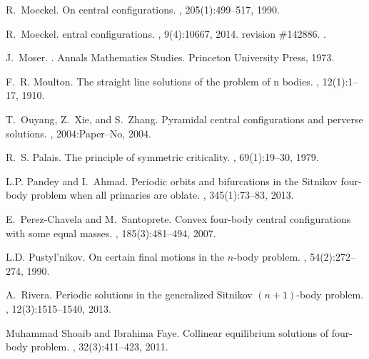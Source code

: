 \documentclass[smallcondensed]{svjour3}
\begin{document}
\begin{thebibliography}{10}
R.~Moeckel.
\newblock On central configurations.
, 205(1):499--517, 1990.

R.~Moeckel.
entral configurations.
, 9(4):10667, 2014.
\newblock revision \#142886.
\newblock \href {http://dx.doi.org/10.4249/scholarpedia.10667}
  {}.

J.~Moser.
.
\newblock Annals Mathematics Studies. Princeton University Press, 1973.

F.~R. Moulton.
\newblock The straight line solutions of the problem of n bodies.
, 12(1):1--17, 1910.

T.~Ouyang, Z.~Xie, and S.~Zhang.
\newblock Pyramidal central configurations and perverse solutions.
, 2004:Paper--No, 2004.

R.~S. Palais.
\newblock The principle of symmetric criticality.
, 69(1):19--30, 1979.

L.P. Pandey and I.~Ahmad.
\newblock Periodic orbits and bifurcations in the {S}itnikov four-body problem
  when all primaries are oblate.
, 345(1):73--83, 2013.

E.~Perez-Chavela and M.~Santoprete.
\newblock Convex four-body central configurations with some equal masses.
, 185(3):481--494,
  2007.

L.D. Pustyl'nikov.
\newblock On certain final motions in the $n$-body problem.
, 54(2):272--274,
  1990.

A.~Rivera.
\newblock Periodic solutions in the generalized {S}itnikov $(n+1)$-body
  problem.
, 12(3):1515--1540,
  2013.

Muhammad Shoaib and Ibrahima Faye.
\newblock Collinear equilibrium solutions of four-body problem.
, 32(3):411--423, 2011.


\end{thebibliography}
\end{document}
